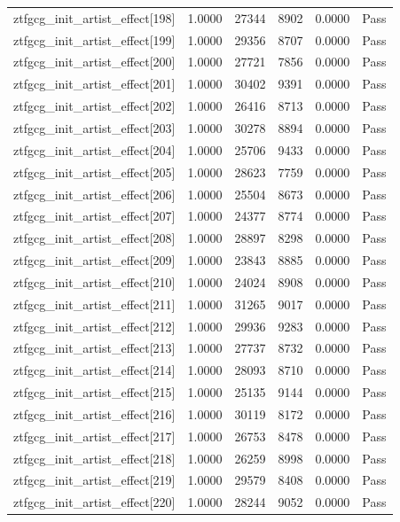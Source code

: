 \begin{table}[htbp]
\begin{tabular}{llrrll}
ztfgcg\_init\_artist\_effect[198] & 1.0000 & 27344 & 8902 & 0.0000 & Pass \\
ztfgcg\_init\_artist\_effect[199] & 1.0000 & 29356 & 8707 & 0.0000 & Pass \\
ztfgcg\_init\_artist\_effect[200] & 1.0000 & 27721 & 7856 & 0.0000 & Pass \\
ztfgcg\_init\_artist\_effect[201] & 1.0000 & 30402 & 9391 & 0.0000 & Pass \\
ztfgcg\_init\_artist\_effect[202] & 1.0000 & 26416 & 8713 & 0.0000 & Pass \\
ztfgcg\_init\_artist\_effect[203] & 1.0000 & 30278 & 8894 & 0.0000 & Pass \\
ztfgcg\_init\_artist\_effect[204] & 1.0000 & 25706 & 9433 & 0.0000 & Pass \\
ztfgcg\_init\_artist\_effect[205] & 1.0000 & 28623 & 7759 & 0.0000 & Pass \\
ztfgcg\_init\_artist\_effect[206] & 1.0000 & 25504 & 8673 & 0.0000 & Pass \\
ztfgcg\_init\_artist\_effect[207] & 1.0000 & 24377 & 8774 & 0.0000 & Pass \\
ztfgcg\_init\_artist\_effect[208] & 1.0000 & 28897 & 8298 & 0.0000 & Pass \\
ztfgcg\_init\_artist\_effect[209] & 1.0000 & 23843 & 8885 & 0.0000 & Pass \\
ztfgcg\_init\_artist\_effect[210] & 1.0000 & 24024 & 8908 & 0.0000 & Pass \\
ztfgcg\_init\_artist\_effect[211] & 1.0000 & 31265 & 9017 & 0.0000 & Pass \\
ztfgcg\_init\_artist\_effect[212] & 1.0000 & 29936 & 9283 & 0.0000 & Pass \\
ztfgcg\_init\_artist\_effect[213] & 1.0000 & 27737 & 8732 & 0.0000 & Pass \\
ztfgcg\_init\_artist\_effect[214] & 1.0000 & 28093 & 8710 & 0.0000 & Pass \\
ztfgcg\_init\_artist\_effect[215] & 1.0000 & 25135 & 9144 & 0.0000 & Pass \\
ztfgcg\_init\_artist\_effect[216] & 1.0000 & 30119 & 8172 & 0.0000 & Pass \\
ztfgcg\_init\_artist\_effect[217] & 1.0000 & 26753 & 8478 & 0.0000 & Pass \\
ztfgcg\_init\_artist\_effect[218] & 1.0000 & 26259 & 8998 & 0.0000 & Pass \\
ztfgcg\_init\_artist\_effect[219] & 1.0000 & 29579 & 8408 & 0.0000 & Pass \\
ztfgcg\_init\_artist\_effect[220] & 1.0000 & 28244 & 9052 & 0.0000 & Pass \\

\end{tabular}
\end{table}
